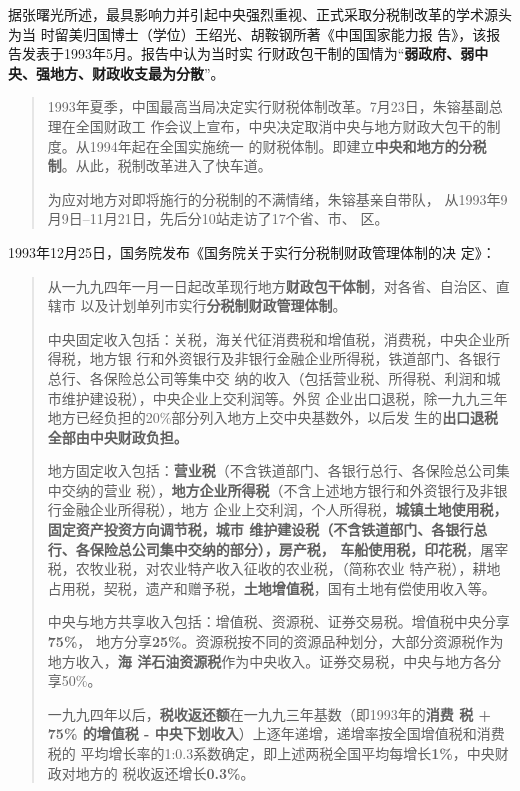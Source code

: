 据张曙光所述，最具影响力并引起中央强烈重视、正式采取分税制改革的学术源头为当
时留美归国博士（学位）王绍光、胡鞍钢所著《中国国家能力报
告》\cite[756]{fengyunshi1b}，该报告发表于1993年5月。报告中认为当时实
行财政包干制的国情为“\textbf{弱政府、弱中央、强地方、财政收支最为分散}”。

\begin{quotation}
  1993年夏季，中国最高当局决定实行财税体制改革。7月23日，朱镕基副总理在全国财政工
  作会议上宣布，中央决定取消中央与地方财政大包干的制度。从1994年起在全国实施统一
  的财税体制。即建立\textbf{中央和地方的分税制}。从此，税制改革进入了快车道。

  为应对地方对即将施行的分税制的不满情绪，朱镕基亲自带队，
  从1993年9月9日--11月21日，先后分10站走访了17个省、市、
  区。\cite[758]{fengyunshi1b}
\end{quotation}

1993年12月25日，国务院发布《国务院关于实行分税制财政管理体制的决
定》：

\begin{quotation}
  从一九九四年一月一日起改革现行地方\textbf{财政包干体制}，对各省、自治区、直辖市
  以及计划单列市实行\textbf{分税制财政管理体制}。

  中央固定收入包括：关税，海关代征消费税和增值税，消费税，中央企业所得税，地方银
  行和外资银行及非银行金融企业所得税，铁道部门、各银行总行、各保险总公司等集中交
  纳的收入（包括营业税、所得税、利润和城市维护建设税），中央企业上交利润等。外贸
  企业出口退税，除一九九三年地方已经负担的20\%部分列入地方上交中央基数外，以后发
  生的\textbf{出口退税全部由中央财政负担。}

  地方固定收入包括：\textbf{营业税}（不含铁道部门、各银行总行、各保险总公司集中交纳的营业
  税），\textbf{地方企业所得税}（不含上述地方银行和外资银行及非银行金融企业所得税），地方
  企业上交利润，个人所得税，\textbf{城镇土地使用税，固定资产投资方向调节税，城市
    维护建设税（不含铁道部门、各银行总行、各保险总公司集中交纳的部分），房产税，
    车船使用税，印花税}，屠宰税，农牧业税，对农业特产收入征收的农业税，（简称农业
  特产税），耕地占用税，契税，遗产和赠予税，\textbf{土地增值税}，国有土地有偿使用收入等。

  中央与地方共享收入包括：增值税、资源税、证券交易税。增值税中央分享\textbf{75\%}，
  地方分享\textbf{25\%}。资源税按不同的资源品种划分，大部分资源税作为地方收入，\textbf{海
    洋石油资源税}作为中央收入。证券交易税，中央与地方各分享50\%。

  一九九四年以后，\textbf{税收返还额}在一九九三年基数（即1993年的\textbf{消费
    税 + 75\% 的增值税 - 中央下划收入}）上逐年递增，递增率按全国增值税和消费税的
  平均增长率的1:0.3系数确定，即上述两税全国平均每增长\textbf{1\%}，中央财政对地方的
  税收返还增长\textbf{0.3\%}。
\end{quotation}


